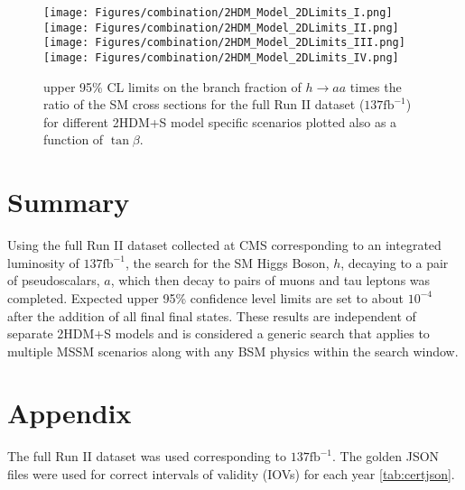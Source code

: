\begin{figure}[ht!b]
  \centering
  \texttt{[image: Figures/combination/2HDM\_Model\_2DLimits\_I.png]}
  \texttt{[image: Figures/combination/2HDM\_Model\_2DLimits\_II.png]}\\
  \texttt{[image: Figures/combination/2HDM\_Model\_2DLimits\_III.png]}
  \texttt{[image: Figures/combination/2HDM\_Model\_2DLimits\_IV.png]}\\
    \caption{\label{fig:2HDM}  upper 95\% CL limits on the branch fraction of $h\rightarrow a a $ times the ratio of the SM cross sections for the full Run II dataset ($\text{137}\text{fb}^{-1}$) for different 2HDM+S model specific scenarios plotted also as a function of $\tan\beta$.}
\end{figure}

\clearpage

\section{Summary}
\label{sec:sum}
Using the full Run II dataset collected at CMS corresponding to an integrated luminosity of $\text{137}\text{fb}^{-1}$, the search for the SM Higgs Boson, $h$, decaying to a pair of pseudoscalars, $a$, which then decay to pairs of muons and tau leptons was completed. 
Expected upper 95\% confidence level limits are set to about $10^{-4}$ after the addition of all final final states. 
These results are independent of separate 2HDM+S models and is considered a generic search that applies to multiple MSSM scenarios along with any BSM physics within the search window. 



\section{Appendix}
\label{app}

The full Run II dataset was used corresponding to $137 \text{fb}^{-1}$. The golden JSON files were used for correct intervals of validity (IOVs) for each year \ref{tab:certjson}. 


\begin{table}[h!tb]
\centering
{}
\label{tab:certjson}
\end{table}



